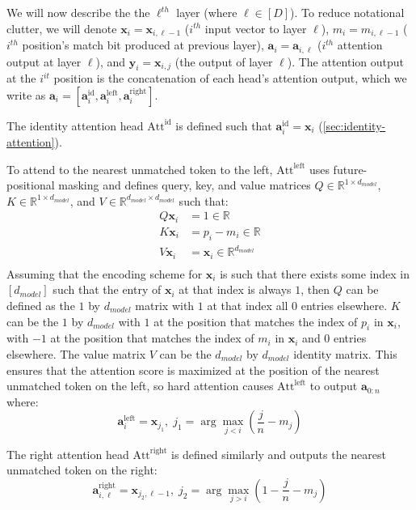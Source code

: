 We will now describe the the $\ell^{\mathit{th}}$ layer (where $\ell \in [D]$). 
To reduce notational clutter, we will denote $\mathbf{x}_{i}=\mathbf{x}_{i,\ell-1}$ ($i^\mathit{th}$ input vector to layer $\ell$), $m_i = m_{i,\ell-1}$ ($i^\mathit{th}$ position's match bit produced at previous layer), $\mathbf{a}_i=\mathbf{a}_{i,\ell}$ ($i^\mathit{th}$ attention output at layer $\ell$), and $\mathbf{y}_{i} = \mathbf{x}_{i,j}$ (the output of layer $\ell$). The attention output at the $i^{\mathit{it}}$ position is the concatenation of each head's attention output, which we write as $\mathbf{a}_{i} = [\mathbf{a}_{i}^{\mathrm{id}}, \mathbf{a}_{i}^{\mathrm{left}}, \mathbf{a}_{i}^{\mathrm{right}}]$.

The identity attention head $\mathrm{Att}^{\mathrm{id}}$ is defined such that $\mathbf{a}_{i}^{\mathrm{id}} = \mathbf{x}_i$ (\cref{sec:identity-attention}).

To attend to the nearest unmatched token to the left, $\mathrm{Att}^{\mathrm{left}}$ uses future-positional masking and defines query, key, and value matrices $Q \in \mathbb{R}^{1 \times d_{model}}$, $K \in \mathbb{R}^{1 \times d_{model}}$, and $V \in \mathbb{R}^{d_{model} \times d_{model}}$ such that:\begin{align*}
    Q\mathbf{x}_{i} & = 1 \in \mathbb{R}\\
    K\mathbf{x}_{i} & = p_i - m_i \in \mathbb{R}\\
    V\mathbf{x}_i & = \mathbf{x}_i \in \mathbb{R}^{d_{model}}\\
\end{align*}
Assuming that the encoding scheme for $\mathbf{x}_i$ is such that there exists some index in $[d_{model}]$ such that the entry of $\mathbf{x}_{i}$ at that index is always $1$, then $Q$ can be defined as the $1$ by $d_{model}$ matrix with $1$ at that index all $0$ entries elsewhere.
$K$ can be the $1$ by $d_{model}$ with $1$ at the position that matches the index of $p_i$ in $\mathbf{x}_i$, with $-1$ at the position that matches the index of $m_i$ in $\mathbf{x}_i$ and $0$ entries elsewhere.
The value matrix $V$ can be the $d_{model}$ by $d_{model}$ identity matrix. This ensures that the attention score is maximized at the position of the nearest unmatched token on the left, so hard attention causes $\mathrm{Att}^{\mathrm{left}}$ to output $\mathbf{a}_{0:n}$ where:
$$\mathbf{a}_{i}^{\mathrm{left}} = \mathbf{x}_{j_1}, \; j_1 = \arg \max_{j<i}\left(\frac{j}{n} - m_{j}\right)$$

The right attention head $\mathrm{Att}^{\mathrm{right}}$ is defined similarly and outputs the nearest unmatched token on the right:
$$\mathbf{a}_{i,\ell}^{\mathrm{right}} =  \mathbf{x}_{j_2,\ell-1}, \; j_2 = \arg \max_{j>i}\left(1 - \frac{j}{n} - m_{j}\right)$$

